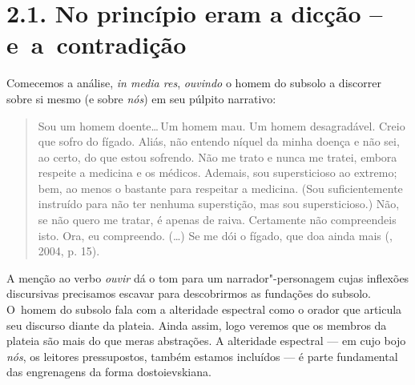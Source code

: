 
\section{2.1. No princípio eram a dicção -- e~a~contradição}

Comecemos a análise, \emph{in media res}, \emph{ouvindo} o homem do
subsolo a discorrer sobre si mesmo (e sobre \emph{nós}) em seu púlpito
narrativo:

\begin{quote}
Sou um homem doente\ldots \,Um homem mau. Um homem desagradável. Creio que
sofro do fígado. Aliás, não entendo níquel da minha doença e não sei, ao
certo, do que estou sofrendo. Não me trato e nunca me tratei, embora
respeite a medicina e os médicos. Ademais, sou supersticioso ao extremo;
bem, ao menos o bastante para respeitar a medicina. (Sou suficientemente
instruído para não ter nenhuma superstição, mas sou supersticioso.) Não,
se não quero me tratar, é apenas de raiva. Certamente não compreendeis
isto. Ora, eu compreendo. (\ldots) Se me dói o fígado, que doa ainda mais
(, 2004, p. 15).
\end{quote}

A menção ao verbo \emph{ouvir} dá o tom para um narrador"-personagem
cujas inflexões discursivas precisamos escavar para descobrirmos as
fundações do subsolo. O~homem do subsolo fala com a alteridade espectral
como o orador que articula seu discurso diante da plateia. Ainda assim,
logo veremos que os membros da plateia são mais do que meras abstrações.
A alteridade espectral --- em cujo bojo \emph{nós}, os leitores
pressupostos, também estamos incluídos --- é parte fundamental das
engrenagens da forma dostoievskiana.

